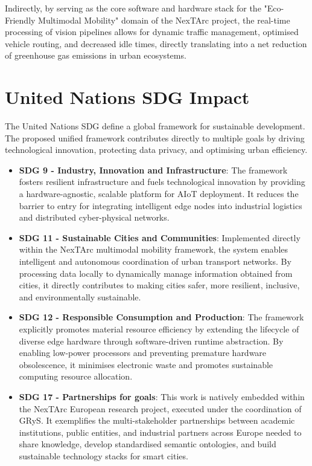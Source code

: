 Indirectly, by serving as the core software and hardware stack for the "Eco-Friendly Multimodal Mobility" domain of the NexTArc project, the real-time processing of vision pipelines allows for dynamic traffic management, optimised vehicle routing, and decreased idle times, directly translating into a net reduction of greenhouse gas emissions in urban ecosystems.

\section{United Nations \texorpdfstring{\acrshort{SDG}}{SDG} Impact}\label{sec:impact:sdg}

The United Nations \gls{SDG} define a global framework for sustainable development. The proposed unified framework contributes directly to multiple goals by driving technological innovation, protecting data privacy, and optimising urban efficiency.

\begin{itemize}
    \item \textbf{\gls{SDG} 9 - Industry, Innovation and Infrastructure}: The framework fosters resilient infrastructure and fuels technological innovation by providing a hardware-agnostic, scalable platform for \gls{AIoT} deployment. It reduces the barrier to entry for integrating intelligent edge nodes into industrial logistics and distributed cyber-physical networks.
    
    \item \textbf{\gls{SDG} 11 - Sustainable Cities and Communities}: Implemented directly within the NexTArc multimodal mobility framework, the system enables intelligent and autonomous coordination of urban transport networks. By processing data locally to dynamically manage information obtained from cities, it directly contributes to making cities safer, more resilient, inclusive, and environmentally sustainable.
    
    \item \textbf{\gls{SDG} 12 - Responsible Consumption and Production}: The framework explicitly promotes material resource efficiency by extending the lifecycle of diverse edge hardware through software-driven runtime abstraction. By enabling low-power processors and preventing premature hardware obsolescence, it minimises electronic waste and promotes sustainable computing resource allocation.

    \item \textbf{\gls{SDG} 17 - Partnerships for goals}: This work is natively embedded within the NexTArc European research project, executed under the coordination of \gls{GRyS}. It exemplifies the multi-stakeholder partnerships between academic institutions, public entities, and industrial partners across Europe needed to share knowledge, develop standardised semantic ontologies, and build sustainable technology stacks for smart cities.
\end{itemize}